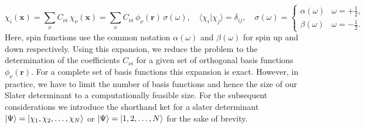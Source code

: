 \begin{equation} %
  \label{eq:spin_orbital_expansion}
  \chi_i(\mathbf x) = \sum_{\nu} C_{\nu i}\,\chi_\nu(\mathbf x) = \sum_{\nu} C_{\nu i}\,\phi_\nu(\mathbf r)\,\sigma(\omega), \quad
  \langle\chi_i|\chi_j\rangle = \delta_{ij},  \quad
  \sigma(\omega) =
    \begin{cases}
      \alpha(\omega)&\omega=+\tfrac12,\\
      \beta(\omega)&\omega=-\tfrac12.
    \end{cases}
\end{equation}
Here, spin functions use the common notation $\alpha(\omega)$ and $\beta(\omega)$ for spin up and down respectively.
Using this expansion, we reduce the problem to the determination of the coefficients $C_{\nu i}$ for a given set of orthogonal basis functions $\phi_\nu(\mathbf{r})$. For a complete set of basis functions this expansion is exact. However, in practice, we have to limit the number of basis functions and hence the size of our Slater determinant to a computationally feasible size. For the subsequent considerations we introduce the shorthand ket for a slater determinant $\ket{\Psi} = \ket{\chi_1, \chi_2, \ldots, \chi_N}$ or $\ket{\Psi} = \ket{1, 2, \ldots, N}$ for the sake of brevity.

